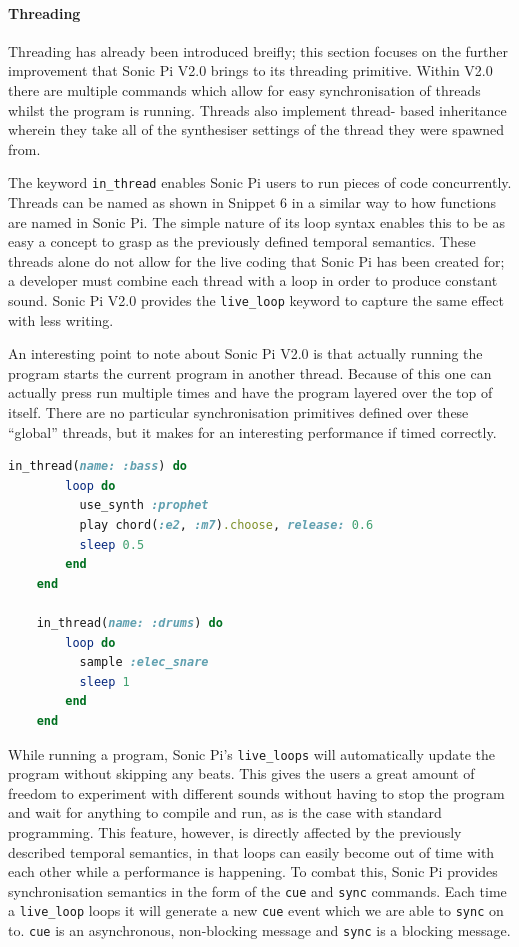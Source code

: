 \documentclass[11pt]{scrartcl}
\begin{document}
\paragraph{Threading}

Threading has already been introduced breifly; this section focuses on the 
further improvement that Sonic Pi V2.0 brings to its threading primitive. 
Within V2.0 there are multiple commands which allow for easy synchronisation 
of threads whilst the program is running. Threads also implement thread-
based inheritance wherein they take all of the synthesiser settings of the 
thread they were spawned from.

The keyword \texttt{in\_thread} enables Sonic Pi users to run pieces of 
code concurrently. Threads can be named as shown in Snippet 6 in a similar way 
to how functions are named in Sonic Pi. The simple nature of its loop syntax 
enables this to be as easy a concept to grasp as the previously defined 
temporal semantics. These threads alone do not allow for the live coding that 
Sonic Pi has been created for; a developer must combine each thread with a loop
in order to produce constant sound. Sonic Pi V2.0 provides the \texttt{live\_loop}
keyword to capture the same effect with less writing.

An interesting point to note about Sonic Pi V2.0 is that actually running the 
program starts the current program in another thread. Because of this one can 
actually press run multiple times and have the program layered over the top of 
itself. There are no particular synchronisation primitives defined over these 
``global'' threads, but it makes for an interesting performance if timed 
correctly.

\begin{minipage}{\textwidth}
	\begin{lstlisting}[language = ruby]
    in_thread(name: :bass) do
        loop do
          use_synth :prophet
          play chord(:e2, :m7).choose, release: 0.6
          sleep 0.5
        end
    end

    in_thread(name: :drums) do
        loop do
          sample :elec_snare
          sleep 1
        end
    end
	\end{lstlisting}
\end{minipage}

While running a program, Sonic Pi's \texttt{live\_loops} will automatically update 
the program without skipping any beats. This gives the users a great amount of 
freedom to experiment with different sounds without having to stop the program 
and wait for anything to compile and run, as is the case with standard 
programming. This feature, however, is directly affected by the previously 
described temporal semantics, in that loops can easily become out of time with 
each other while a performance is happening. To combat this, Sonic Pi provides 
synchronisation semantics in the form of the \texttt{cue} and \texttt{sync} 
commands. Each time a \texttt{live\_loop} loops it will generate a new \texttt{cue} 
event which we are able to \texttt{sync} on to. \texttt{cue} is an asynchronous,
non-blocking message and \texttt{sync} is a blocking message.
\end{document}
